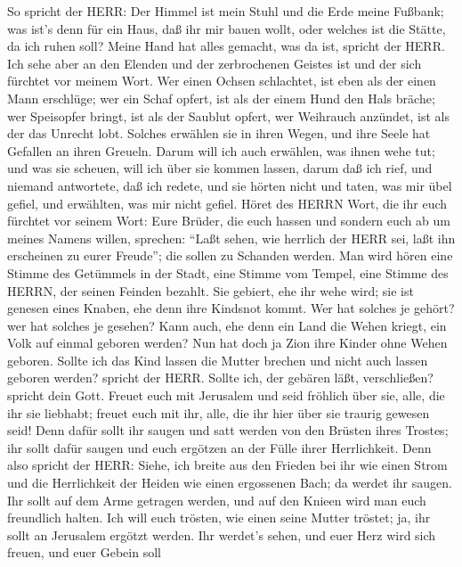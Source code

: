  So spricht der HERR: Der Himmel ist mein Stuhl und die Erde
meine Fußbank; was ist's denn für ein Haus, daß ihr mir bauen wollt,
oder welches ist die Stätte, da ich ruhen soll?  Meine Hand
hat alles gemacht, was da ist, spricht der HERR. Ich sehe aber an den
Elenden und der zerbrochenen Geistes ist und der sich fürchtet vor
meinem Wort.  Wer einen Ochsen schlachtet, ist eben als der
einen Mann erschlüge; wer ein Schaf opfert, ist als der einem Hund den
Hals bräche; wer Speisopfer bringt, ist als der Saublut opfert, wer
Weihrauch anzündet, ist als der das Unrecht lobt. Solches erwählen sie
in ihren Wegen, und ihre Seele hat Gefallen an ihren Greueln.
 Darum will ich auch erwählen, was ihnen wehe tut; und was
sie scheuen, will ich über sie kommen lassen, darum daß ich rief, und
niemand antwortete, daß ich redete, und sie hörten nicht und taten, was
mir übel gefiel, und erwählten, was mir nicht gefiel.  Höret
des HERRN Wort, die ihr euch fürchtet vor seinem Wort: Eure Brüder, die
euch hassen und sondern euch ab um meines Namens willen, sprechen:
``Laßt sehen, wie herrlich der HERR sei, laßt ihn erscheinen zu eurer
Freude''; die sollen zu Schanden werden.  Man wird hören
eine Stimme des Getümmels in der Stadt, eine Stimme vom Tempel, eine
Stimme des HERRN, der seinen Feinden bezahlt.  Sie gebiert,
ehe ihr wehe wird; sie ist genesen eines Knaben, ehe denn ihre Kindsnot
kommt.  Wer hat solches je gehört? wer hat solches je
gesehen? Kann auch, ehe denn ein Land die Wehen kriegt, ein Volk auf
einmal geboren werden? Nun hat doch ja Zion ihre Kinder ohne Wehen
geboren.  Sollte ich das Kind lassen die Mutter brechen und
nicht auch lassen geboren werden? spricht der HERR. Sollte ich, der
gebären läßt, verschließen? spricht dein Gott.  Freuet euch
mit Jerusalem und seid fröhlich über sie, alle, die ihr sie liebhabt;
freuet euch mit ihr, alle, die ihr hier über sie traurig gewesen seid!
 Denn dafür sollt ihr saugen und satt werden von den
Brüsten ihres Trostes; ihr sollt dafür saugen und euch ergötzen an der
Fülle ihrer Herrlichkeit.  Denn also spricht der HERR:
Siehe, ich breite aus den Frieden bei ihr wie einen Strom und die
Herrlichkeit der Heiden wie einen ergossenen Bach; da werdet ihr saugen.
Ihr sollt auf dem Arme getragen werden, und auf den Knieen wird man euch
freundlich halten.  Ich will euch trösten, wie einen seine
Mutter tröstet; ja, ihr sollt an Jerusalem ergötzt werden. 
Ihr werdet's sehen, und euer Herz wird sich freuen, und euer Gebein soll
